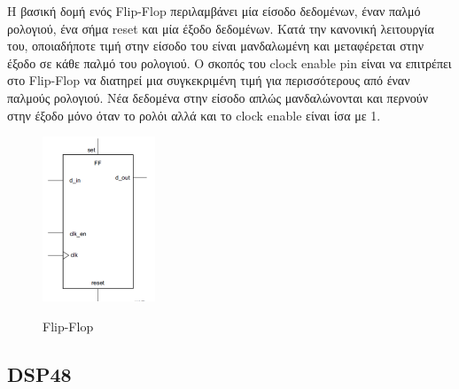 Η βασική δομή ενός Flip-Flop περιλαμβάνει μία είσοδο δεδομένων, έναν παλμό ρολογιού, ένα σήμα reset και μία έξοδο δεδομένων. Κατά την κανονική λειτουργία του, οποιαδήποτε τιμή στην είσοδο του είναι μανδαλωμένη και μεταφέρεται στην έξοδο σε κάθε παλμό του ρολογιού. Ο σκοπός του clock enable pin είναι να επιτρέπει στο Flip-Flop να διατηρεί μια συγκεκριμένη τιμή για περισσότερους από έναν παλμούς ρολογιού. Νέα δεδομένα στην είσοδο απλώς μανδαλώνονται και περνούν στην έξοδο μόνο όταν το ρολόι αλλά και το clock enable είναι ίσα με 1.
\begin{figure}[H]
  	\centering
	\includegraphics[width=0.3\textwidth]{images/FF}\\
	\caption{Flip-Flop \cite{ff}}
\end{figure}
\subsection{DSP48}

